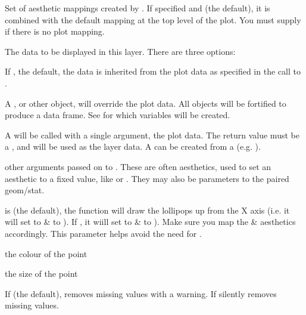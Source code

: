 \documentclass[a4paper]{book}
\begin{document}
\begin{Arguments}
\begin{ldescription}
\item[\code{mapping}] Set of aesthetic mappings created by . If specified and
 (the default), it is combined with the default mapping
at the top level of the plot. You must supply  if there is no plot
mapping.

\item[\code{data}] The data to be displayed in this layer. There are three
options:

If , the default, the data is inherited from the plot
data as specified in the call to .

A , or other object, will override the plot
data. All objects will be fortified to produce a data frame. See
 for which variables will be created.

A  will be called with a single argument,
the plot data. The return value must be a , and
will be used as the layer data. A  can be created
from a  (e.g. ).

\item[\code{...}] other arguments passed on to . These are
often aesthetics, used to set an aesthetic to a fixed value, like
 or . They may also be parameters
to the paired geom/stat.

\item[\code{horizontal}]  is  (the default), the function
will draw the lollipops up from the X axis (i.e. it will set 
to  \&  to ). If , it wiill set
 to  \&  to ). Make sure you map the
 \&  aesthetics accordingly. This parameter helps avoid
the need for .

\item[\code{point.colour}] the colour of the point

\item[\code{point.size}] the size of the point

\item[\code{na.rm}] If  (the default), removes missing values with
a warning.  If  silently removes missing values.


\end{ldescription}
\end{Arguments}
\end{document}
